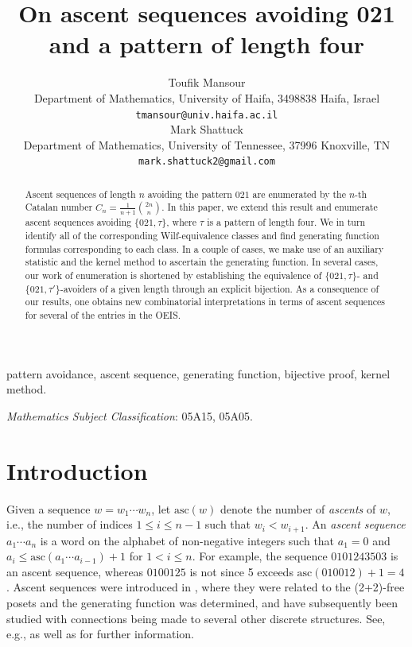 \documentclass{article}
\theoremstyle{remark}
\theoremstyle{plain}
\begin{document}
\title{On ascent sequences avoiding 021 and a pattern of length four}
\author{Toufik Mansour\\
\small Department of Mathematics, University of Haifa, 3498838 Haifa, Israel\\[-0.8ex]
\small\texttt{tmansour@univ.haifa.ac.il}\\[1.8ex]
Mark Shattuck\\
\small Department of Mathematics, University of Tennessee, 37996 Knoxville, TN\\[-0.8ex]
\small\texttt{mark.shattuck2@gmail.com}\\[1.8ex]
}
\date{\small }%
\maketitle

\begin{abstract}
Ascent sequences of length $n$ avoiding the pattern $021$ are enumerated by the $n$-th Catalan number $C_n=\frac{1}{n+1}\binom{2n}{n}$.  In this paper, we extend this result and enumerate ascent sequences avoiding $\{021,\tau\}$, where $\tau$ is a pattern of length four.  We in turn identify all of the corresponding Wilf-equivalence classes and find generating function formulas corresponding to each class.  In a couple of cases, we make use of an auxiliary statistic and the kernel method to ascertain the generating function. In several cases, our work of enumeration is shortened by establishing the equivalence of $\{021,\tau\}$- and $\{021,\tau'\}$-avoiders of a given length through an explicit bijection.  As a consequence of our results, one obtains new combinatorial interpretations in terms of ascent sequences for several of the entries in the OEIS.
\end{abstract}

 pattern avoidance, ascent sequence, generating function, bijective proof, kernel method.

 {\em Mathematics Subject Classification}:  05A15, 05A05.

\section{Introduction}

Given a sequence $w=w_1\cdots w_n$, let $\text{asc}(w)$ denote the number of \emph{ascents} of $w$, i.e., the number of indices $1 \leq i \leq n-1$ such that $w_i<w_{i+1}$.  An \emph{ascent sequence} $a_1\cdots a_n$ is a word on the alphabet of non-negative integers such that $a_1=0$ and $a_i \leq \text{asc}(a_1\cdots a_{i-1})+1$ for $1<i\leq n$.  For example, the sequence $0101243503$ is an ascent sequence, whereas $0100125$ is not since 5 exceeds $\text{asc}(010012)+1=4$.   Ascent sequences were introduced in \cite{BCD}, where they were related to the (2+2)-free posets and the generating function was determined,  and have subsequently been studied with connections being made to several other discrete structures.  See, e.g., \cite{CDK,DP,KR} as well as \cite[Section 3.2.2]{K} for further information.
\end{document}
